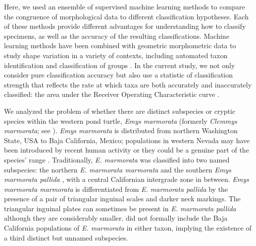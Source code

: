 \documentclass[11pt]{article}
\begin{document}
Here, we used an ensemble of supervised machine learning methods to compare the congruence of morphological data to different classification hypotheses. Each of these methods provide different advantages for understanding how to classify specimens, as well as the accuracy of the resulting classifications. 
Machine learning methods have been combined with geometric morphometric data to study shape variation in a variety of contexts, including automated taxon identification and classification of groups \citep{Baylac2003,Dobigny2003,MacLeod2007,VanBocxlaer2010,VandenBrink2011,Navega2015}. %
In the current study, we not only consider pure classification accuracy but also use a statistic of classification strength that reflects the rate at which taxa are both accurately and inaccurately classified: the area under the Receiver Operating Characteristic curve \citep{Hastie2009}. 

We analyzed the problem of whether there are distinct subspecies or cryptic species within the western pond turtle, \textit{Emys marmorata} \citep{Baird1852} (formerly \emph{Clemmys marmorata}; see \citealp{Feldman2002}). \textit{Emys marmorata} is distributed from northern Washington State, USA to Baja California, Mexico; populations in western Nevada may have been introduced by recent human activity or they could be a genuine part of the species' range \citep{Bury2017}. Traditionally, \textit{E. marmorata} was classified into two named subspecies: the northern \textit{E. marmorata marmorata} and the southern \textit{Emys marmorata pallida} \citep{Seeliger1945}, with a central Californian intergrade zone in between. \textit{Emys marmorata marmorata} is differentiated from \textit{E. marmorata pallida} by the presence of a pair of triangular inguinal scales and darker neck markings. The triangular inguinal plates can sometimes be present in \textit{E. marmorata pallida} although they are considerably smaller. \citet{Seeliger1945} did not formally include the Baja California populations of \textit{E. marmorata} in either taxon, implying the existence of a third distinct but unnamed subspecies.
\end{document}
